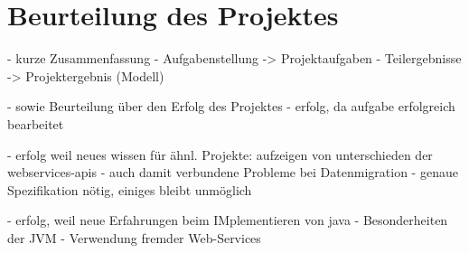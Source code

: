 \section{Beurteilung des Projektes}
\label{sec:beurteilung}

- kurze Zusammenfassung
	- Aufgabenstellung -> Projektaufgaben
	- Teilergebnisse -> Projektergebnis (Modell)
	
- sowie Beurteilung über den Erfolg des Projektes	
	- erfolg, da aufgabe erfolgreich bearbeitet
	
	- erfolg weil neues wissen für ähnl. Projekte: aufzeigen von unterschieden der webservices-apis
		- auch damit verbundene Probleme bei Datenmigration
		- genaue Spezifikation nötig, einiges bleibt unmöglich
		
	- erfolg, weil neue Erfahrungen beim IMplementieren von java
		- Besonderheiten der JVM
		- Verwendung fremder Web-Services
	
